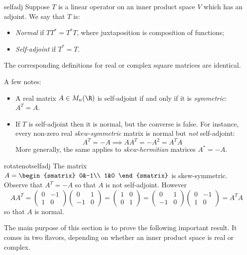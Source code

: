 \begin{defn}{}{selfadj}
Suppose $T$ is a linear operator on an inner product space $V$ which has an adjoint. We say that $T$ is:
\begin{itemize}
	\item[]\emph{Normal} if $TT^*=T^*T$, where juxtaposition is composition of functions;
	\item[]\emph{Self-adjoint} if $T^*=T$.
\end{itemize}
The corresponding definitions for real or complex square matrices are identical.
\end{defn}

A few notes:
\begin{itemize}
  \item A real matrix $A\in M_n(\R)$ is self-adjoint if and only if it is \emph{symmetric}: $A^T=A$.
  \item If $T$ is self-adjoint then it is normal, but the converse is false. For instance, every non-zero real \emph{skew-symmetric} matrix is normal but \emph{not} self-adjoint:
  \[A^T=-A\implies AA^T=-A^2=A^TA\]
  More generally, the same applies to \emph{skew-hermitian} matrices $A^*=-A$. 
\end{itemize}

\begin{example}{}{rotatenotselfadj}
The matrix $A=\begin{smatrix}
0&-1\\
1&0
\end{smatrix}$ is skew-symmetric. Observe that $A^T=-A$ so that $A$ is not self-adjoint. However
\[AA^T=\begin{pmatrix}
0&-1\\
1&0
\end{pmatrix}\begin{pmatrix}
0&1\\
-1&0
\end{pmatrix}=\begin{pmatrix}
1&0\\
0&1
\end{pmatrix}=\begin{pmatrix}
0&1\\
-1&0
\end{pmatrix}\begin{pmatrix}
0&-1\\
1&0
\end{pmatrix}=A^TA\]
so that $A$ is normal.
\end{example}

The main purpose of this section is to prove the following important result. It comes in two flavors, depending on whether an inner product space is real or complex.

